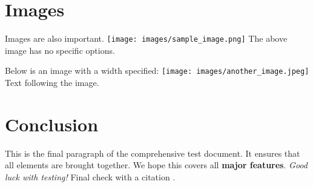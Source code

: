 \section{Images}
Images are also important.
\texttt{[image: images/sample\_image.png]}
The above image has no specific options.

Below is an image with a width specified:
\texttt{[image: images/another\_image.jpeg]}
Text following the image.

\section{Conclusion}
This is the final paragraph of the comprehensive test document. It ensures that all elements are brought together.
We hope this covers all \textbf{major features}. \textit{Good luck with testing!}
Final check with a citation \citep[see generally][]{final_key_2025}.
